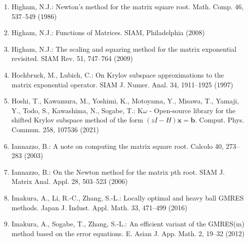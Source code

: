 \begin{enumerate}[label=\arabic*.,ref=\arabic*,leftmargin=3em]
\item\label{bib:source-96}Higham, N.J.: Newton’s method for the matrix square root. Math. Comp. 46, 537–549 (1986)

\item\label{bib:source-97}Higham, N.J.: Functions of Matrices. SIAM, Philadelphia (2008)

\item\label{bib:source-98}Higham, N.J.: The scaling and squaring method for the matrix exponential revisited. SIAM Rev. 51, 747–764 (2009)

\item\label{bib:source-99}Hochbruck, M., Lubich, C.: On Krylov subspace approximations to the matrix exponential operator. SIAM J. Numer. Anal. 34, 1911–1925 (1997)

\item\label{bib:source-100}Hoshi, T., Kawamura, M., Yoshimi, K., Motoyama, Y., Misawa, T., Yamaji, Y., Todo, S., Kawashima, N., Sogabe, T.: K$\omega$ - Open-source library for the shifted Krylov subspace method of the form $(zI-H)\boldsymbol{x}=\boldsymbol{b}$. Comput. Phys. Commun. 258, 107536 (2021)

\item\label{bib:source-101}Iannazzo, B.: A note on computing the matrix square root. Calcolo 40, 273–283 (2003)

\item\label{bib:source-102}Iannazzo, B.: On the Newton method for the matrix pth root. SIAM J. Matrix Anal. Appl. 28, 503–523 (2006)

\item\label{bib:source-103}Imakura, A., Li, R.-C., Zhang, S.-L.: Locally optimal and heavy ball GMRES methods. Japan J. Indust. Appl. Math. 33, 471–499 (2016)

\item\label{bib:source-104}Imakura, A., Sogabe, T., Zhang, S.-L.: An efficient variant of the GMRES(m) method based on the error equations. E. Asian J. App. Math. 2, 19–32 (2012)


\end{enumerate}
